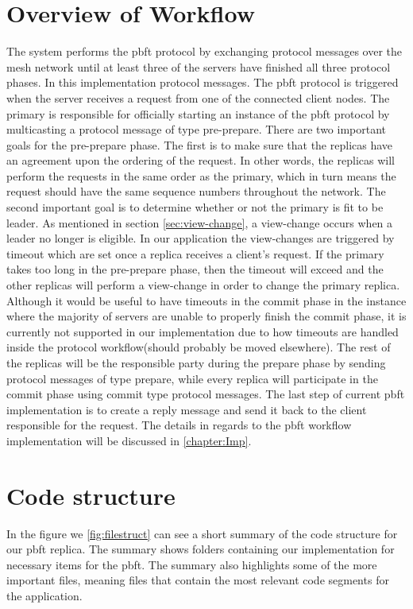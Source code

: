 \section{Overview of Workflow}
The system performs the \ac{pbft} protocol by exchanging protocol messages over the mesh network until at least three of the servers have finished all three protocol phases. In this implementation protocol messages. The \ac{pbft} protocol is triggered when the server receives a request from one of the connected client nodes. The primary is responsible for officially starting an instance of the \ac{pbft} protocol by multicasting a protocol message of type pre-prepare. There are two important goals for the pre-prepare phase. The first is to make sure that the replicas have an agreement upon the ordering of the request. In other words, the replicas will perform the requests in the same order as the primary, which in turn means the request should have the same sequence numbers throughout the network. The second important goal is to determine whether or not the primary is fit to be leader. As mentioned in section \autoref{sec:view-change}, a view-change occurs when a leader no longer is eligible. In our application the view-changes are triggered by timeout which are set once a replica receives a client's request. If the primary takes too long in the pre-prepare phase, then the timeout will exceed and the other replicas will perform a view-change in order to change the primary replica. Although it would be useful to have timeouts in the commit phase in the instance where the majority of servers are unable to properly finish the commit phase, it is currently not supported in our implementation due to how timeouts are handled inside the protocol workflow(should probably be moved elsewhere). The rest of the replicas will be the responsible party during the prepare phase by sending protocol messages of type prepare, while every replica will participate in the commit phase using commit type protocol messages. The last step of current \ac{pbft} implementation is to create a reply message and send it back to the client responsible for the request. The details in regards to the \ac{pbft} workflow implementation will be discussed in \autoref{chapter:Imp}.

\section{Code structure}
In the figure we \autoref{fig:filestruct} can see a short summary of the code structure for our \ac{pbft} replica. The summary shows folders containing our implementation for necessary items for the \ac{pbft}. The summary also highlights some of the more important files, meaning files that contain the most relevant code segments for the application.

